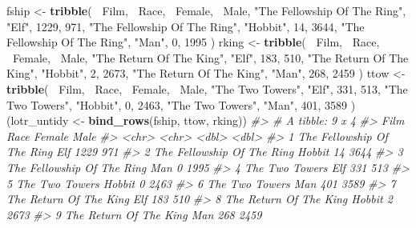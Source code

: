 \documentclass[
]{book}
\newenvironment{Shaded}{\begin{snugshade}}{\end{snugshade}}
\newcommand{\CommentTok}[1]{\textcolor[rgb]{0.56,0.35,0.01}{\textit{#1}}}
\newcommand{\DecValTok}[1]{\textcolor[rgb]{0.00,0.00,0.81}{#1}}
\newcommand{\KeywordTok}[1]{\textcolor[rgb]{0.13,0.29,0.53}{\textbf{#1}}}
\newcommand{\NormalTok}[1]{#1}
\newcommand{\OperatorTok}[1]{\textcolor[rgb]{0.81,0.36,0.00}{\textbf{#1}}}
\newcommand{\StringTok}[1]{\textcolor[rgb]{0.31,0.60,0.02}{#1}}
\begin{document}
\begin{Shaded}
\begin{Highlighting}[]
\NormalTok{fship <-}\StringTok{ }\KeywordTok{tribble}\NormalTok{(}
                         \OperatorTok{~}\NormalTok{Film,    }\OperatorTok{~}\NormalTok{Race, }\OperatorTok{~}\NormalTok{Female, }\OperatorTok{~}\NormalTok{Male,}
  \StringTok{"The Fellowship Of The Ring"}\NormalTok{,    }\StringTok{"Elf"}\NormalTok{,    }\DecValTok{1229}\NormalTok{,   }\DecValTok{971}\NormalTok{,}
  \StringTok{"The Fellowship Of The Ring"}\NormalTok{, }\StringTok{"Hobbit"}\NormalTok{,      }\DecValTok{14}\NormalTok{,  }\DecValTok{3644}\NormalTok{,}
  \StringTok{"The Fellowship Of The Ring"}\NormalTok{,    }\StringTok{"Man"}\NormalTok{,       }\DecValTok{0}\NormalTok{,  }\DecValTok{1995}
\NormalTok{)}
\NormalTok{rking <-}\StringTok{ }\KeywordTok{tribble}\NormalTok{(}
                         \OperatorTok{~}\NormalTok{Film,    }\OperatorTok{~}\NormalTok{Race, }\OperatorTok{~}\NormalTok{Female, }\OperatorTok{~}\NormalTok{Male,}
      \StringTok{"The Return Of The King"}\NormalTok{,    }\StringTok{"Elf"}\NormalTok{,     }\DecValTok{183}\NormalTok{,   }\DecValTok{510}\NormalTok{,}
      \StringTok{"The Return Of The King"}\NormalTok{, }\StringTok{"Hobbit"}\NormalTok{,       }\DecValTok{2}\NormalTok{,  }\DecValTok{2673}\NormalTok{,}
      \StringTok{"The Return Of The King"}\NormalTok{,    }\StringTok{"Man"}\NormalTok{,     }\DecValTok{268}\NormalTok{,  }\DecValTok{2459}
\NormalTok{)}
\NormalTok{ttow <-}\StringTok{ }\KeywordTok{tribble}\NormalTok{(}
                         \OperatorTok{~}\NormalTok{Film,    }\OperatorTok{~}\NormalTok{Race, }\OperatorTok{~}\NormalTok{Female, }\OperatorTok{~}\NormalTok{Male,}
              \StringTok{"The Two Towers"}\NormalTok{,    }\StringTok{"Elf"}\NormalTok{,     }\DecValTok{331}\NormalTok{,   }\DecValTok{513}\NormalTok{,}
              \StringTok{"The Two Towers"}\NormalTok{, }\StringTok{"Hobbit"}\NormalTok{,       }\DecValTok{0}\NormalTok{,  }\DecValTok{2463}\NormalTok{,}
              \StringTok{"The Two Towers"}\NormalTok{,    }\StringTok{"Man"}\NormalTok{,     }\DecValTok{401}\NormalTok{,  }\DecValTok{3589}
\NormalTok{)}
\NormalTok{(lotr_untidy <-}\StringTok{ }\KeywordTok{bind_rows}\NormalTok{(fship, ttow, rking))}
\CommentTok{#> # A tibble: 9 x 4}
\CommentTok{#>   Film                       Race   Female  Male}
\CommentTok{#>   <chr>                      <chr>   <dbl> <dbl>}
\CommentTok{#> 1 The Fellowship Of The Ring Elf      1229   971}
\CommentTok{#> 2 The Fellowship Of The Ring Hobbit     14  3644}
\CommentTok{#> 3 The Fellowship Of The Ring Man         0  1995}
\CommentTok{#> 4 The Two Towers             Elf       331   513}
\CommentTok{#> 5 The Two Towers             Hobbit      0  2463}
\CommentTok{#> 6 The Two Towers             Man       401  3589}
\CommentTok{#> 7 The Return Of The King     Elf       183   510}
\CommentTok{#> 8 The Return Of The King     Hobbit      2  2673}
\CommentTok{#> 9 The Return Of The King     Man       268  2459}
\end{Highlighting}
\end{Shaded}
\end{document}
